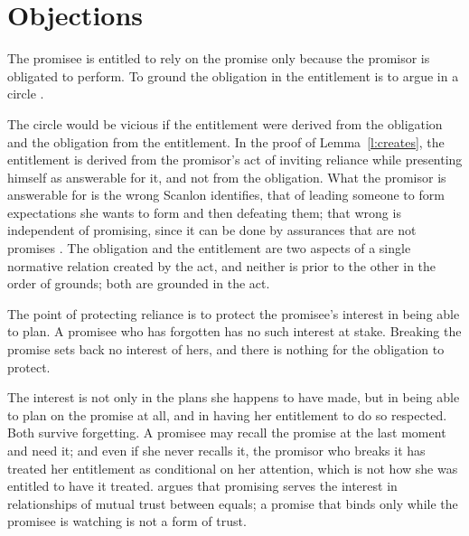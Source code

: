 \documentclass{situationist-preprint}
\begin{document}
\section{Objections}

\begin{objection}[Circularity]
The promisee is entitled to rely on the promise only because the promisor is obligated to perform. To ground the obligation in the entitlement is to argue in a circle \citep{KolodnyWallace2003}.
\end{objection}

\begin{reply}
The circle would be vicious if the entitlement were derived from the obligation and the obligation from the entitlement. In the proof of Lemma~\ref{l:creates}, the entitlement is derived from the promisor's act of inviting reliance while presenting himself as answerable for it, and not from the obligation. What the promisor is answerable for is the wrong Scanlon identifies, that of leading someone to form expectations she wants to form and then defeating them; that wrong is independent of promising, since it can be done by assurances that are not promises \citep{Scanlon1998}. The obligation and the entitlement are two aspects of a single normative relation created by the act, and neither is prior to the other in the order of grounds; both are grounded in the act.
\end{reply}

\begin{objection}
The point of protecting reliance is to protect the promisee's interest in being able to plan. A promisee who has forgotten has no such interest at stake. Breaking the promise sets back no interest of hers, and there is nothing for the obligation to protect.
\end{objection}

\begin{reply}
The interest is not only in the plans she happens to have made, but in being able to plan on the promise at all, and in having her entitlement to do so respected. Both survive forgetting. A promisee may recall the promise at the last moment and need it; and even if she never recalls it, the promisor who breaks it has treated her entitlement as conditional on her attention, which is not how she was entitled to have it treated. \citet{Shiffrin2008} argues that promising serves the interest in relationships of mutual trust between equals; a promise that binds only while the promisee is watching is not a form of trust.
\end{reply}
\end{document}
